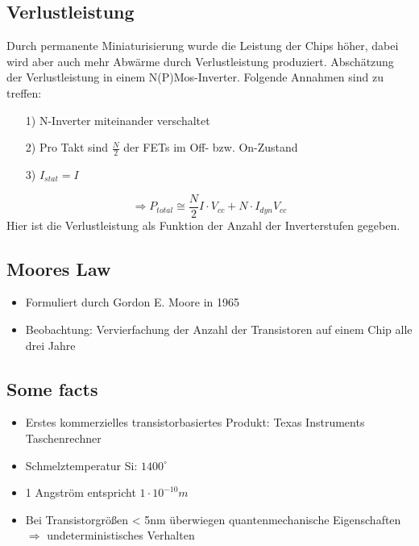 \documentclass[12pt,a4paper]{report}%
\numberwithin{equation}{section}
\numberwithin{equation}{subsection}
\begin{document}
  \subsection{Verlustleistung}
  Durch permanente Miniaturisierung wurde die Leistung der Chips höher, dabei wird aber auch mehr Abwärme durch Verlustleistung produziert.
  Abschätzung der Verlustleistung in einem N(P)Mos-Inverter. Folgende Annahmen sind zu treffen:
  \begin{itemize}
    \item[1) ] N-Inverter miteinander verschaltet
    \item[2) ] Pro Takt sind $\frac{N}{2}$ der FETs im Off- bzw. On-Zustand
    \item[3) ] $I_{stat} = I$
  \end{itemize}
  \begin{equation}
    \Rightarrow P_{total} \cong \frac{N}{2} I \cdot V_{cc} + N \cdot I_{dyn} V_{cc} \label{eq:p_tot_N}
  \end{equation}
  Hier ist die Verlustleistung als Funktion der Anzahl der Inverterstufen gegeben.
  
  \subsection{Moores Law}
  \begin{itemize}
    \item Formuliert durch Gordon E. Moore in 1965
    \item Beobachtung: Vervierfachung der Anzahl der Transistoren auf einem Chip alle drei Jahre
  \end{itemize}
  
  \subsection{Some facts}
  \begin{itemize}
    \item Erstes kommerzielles transistorbasiertes Produkt: Texas Instruments Taschenrechner
    \item Schmelztemperatur Si: $1400^{\circ}$
    \item 1 Angström entspricht $1 \cdot 10^{-10}m$
    \item Bei Transistorgrößen < 5nm überwiegen quantenmechanische Eigenschaften $\Rightarrow$ undeterministisches Verhalten
  \end{itemize}
\newpage
\end{document}
